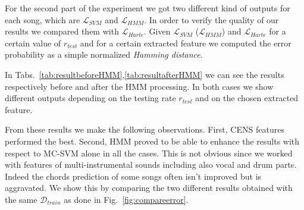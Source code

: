 For the second part of the experiment we got two different kind of outputs for each song, which are $\mathcal{L}_{SVM}$ and $\mathcal{L}_{HMM}$. In order to verify the quality of our results we compared them with  $\mathcal{L}_{Harte}$. Given $\mathcal{L}_{SVM}$ ($\mathcal{L}_{HMM}$) and $\mathcal{L}_{Harte}$ for a certain value of $r_{test}$ and for a certain extracted feature we computed the error probability as a simple normalized \textit{Hamming distance}.

 In Tabs.~\ref{tab:resultbeforeHMM},\ref{tab:resultafterHMM} we can see the results respectively before and after the HMM processing. In both cases we show different outputs depending on the testing rate $r_{test}$ and on the chosen extracted feature.

%

 From these results we make the following observations. First, CENS features performed the best. Second, HMM proved to be able to enhance the results with respect to MC-SVM alone in all the cases. This is not obvious since we worked with features of multi-instrumental sounds including also vocal and drum parts. Indeed the chords prediction of some songs often isn't improved but is aggravated. We show this by comparing the two different results obtained with the same $\mathcal{D}_{train}$ as done in Fig.~\ref{fig:compareerror}.

